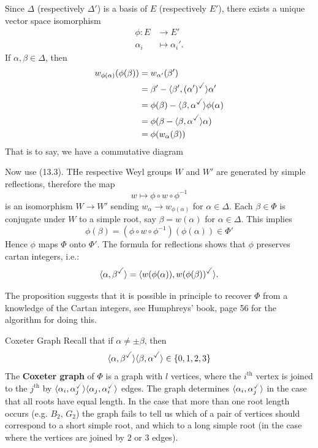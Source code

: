 \documentclass{article}
\begin{document}
\proof Since $\Delta$ (respectively $\Delta'$) is a basis of $E$ (respectively $E'$), there exists a unique vector space isomorphism \begin{align*}
    \phi : E &\to E'\\ 
    \alpha_{i} &\mapsto \alpha_{i}'.
\end{align*}
If $\alpha, \beta \in \Delta$, then \begin{align*}
    w_{\phi(\alpha)}(\phi(\beta)) &= w_{\alpha'}(\beta')\\
    &= \beta' - \langle \beta', (\alpha')^{\checked} \rangle \alpha'\\
    &= \phi(\beta) - \langle \beta, \alpha^{\checked} \rangle \phi(\alpha)\\
    &= \phi(\beta - \langle \beta, \alpha^{\checked} \rangle \alpha )\\
    &= \phi(w_{\alpha}(\beta))
\end{align*}
That is to say, we have a commutative diagram \begin{center}
\end{center}
Now use (13.3). THe respective Weyl groups $W$ and $W'$ are generated by simple reflections, therefore the map \[ w \mapsto \phi \circ w \circ \phi^{-1}\]
is an isomorphism $W \to W'$ sending $w_{\alpha} \to w_{\phi(\alpha)}$ for $\alpha \in \Delta$. Each $\beta \in \Phi$ is conjugate under $W$ to a simple root, say $\beta = w(\alpha)$ for $\alpha \in \Delta$. This implies \[ \phi(\beta) = (\phi \circ w \circ \phi^{-1})(\phi(\alpha)) \in \Phi'\]
Hence $\phi$ maps $\Phi$ onto $\Phi'$. The formula for reflections shows that $\phi$ preserves cartan integers, i.e.: \[ \langle \alpha, \beta^{\checked} \rangle = \langle w(\phi(\alpha)), w(\phi(\beta))^{\checked} \rangle. \] \endproof 
\begin{remark*}
    The proposition suggests that it is possible in principle to recover $\Phi$ from a knowledge of the Cartan integers, see Humphreys' book, page 56 for the algorithm for doing this.
\end{remark*}
\begin{fancydefine}{Coxeter Graph}
    Recall that if $\alpha \neq \pm \beta$, then \[ \langle \alpha, \beta^{\checked} \rangle \langle \beta, \alpha^{\checked} \rangle \in \{0,1,2,3\} \]
    The \textbf{Coxeter graph} of $\Phi$ is a graph with $l$ vertices, where the $i^{\text{th}}$ vertex is joined to the $j^{\text{th}}$ by $\langle \alpha_{i}, \alpha_{j}^{\checked} \rangle \langle \alpha_{j}, \alpha_{i}^{\checked} \rangle$ edges. The graph determines $\langle \alpha_{i}, \alpha_{j}^{\checked} \rangle$ in the case that all roots have equal length. \gap In the case that more than one root length occurs (e.g. $B_{2}, \, G_{2}$) the graph fails to tell us which of a pair of vertices should correspond to a short simple root, and which to a long simple root (in the case where the vertices are joined by $2$ or $3$ edges).
\end{fancydefine}
\end{document}
